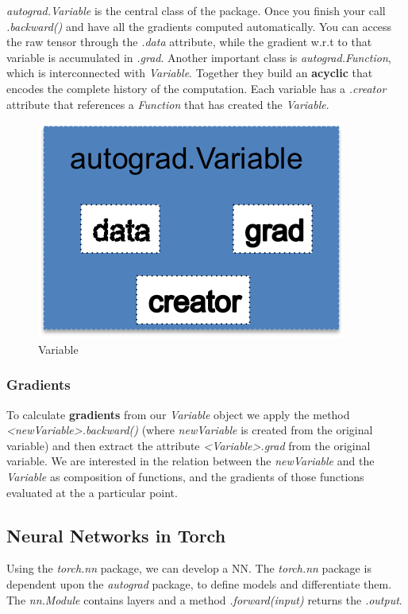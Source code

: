 \documentclass[]{report}
\newcommand{\tif}{\textit}
\begin{document}
\textit{autograd.Variable} is the central class of the package. Once you finish your call \textit{.backward()} and have all the gradients computed automatically. You can access the raw tensor through the \textit{.data} attribute, while the gradient w.r.t to that variable is accumulated in \textit{.grad}. 
Another important class is \textit{autograd.Function}, which is interconnected with \textit{Variable}. Together they build an \textbf{acyclic} that encodes the complete history of the computation. Each variable has a \textit{.creator} attribute that references a \textit{Function} that has created the \textit{Variable}.  
\begin{figure}[!]
\centering
\includegraphics{../Pytorch_learning/autograd}\caption{Variable}
\end{figure}

\subsubsection{Gradients}

To calculate \textbf{gradients} from our \textit{Variable} object we apply the method \textit{<newVariable>.backward()} (where \textit{newVariable} is created from the original variable) and then extract the attribute \textit{<Variable>.grad} from the original variable. We are interested in the relation between the \textit{newVariable} and the \textit{Variable} as composition of functions, and the gradients of those functions evaluated at the a particular point. 


\subsection{Neural Networks in Torch}

Using the \textit{torch.nn} package, we can develop a NN. The \textit{torch.nn} package is dependent upon the \textit{autograd} package, to define models and differentiate them.  The \tif{nn.Module} contains layers and a method \tif{.forward(input)} returns the \tif{.output}. 
\end{document}
